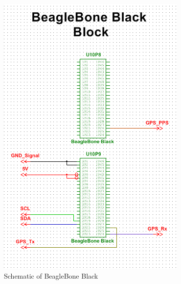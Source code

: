 

\begin{figure}[h]
\centering
\includegraphics[width=\textwidth,height=\textheight,keepaspectratio]{./KIRBY_Images/Multisim_BBB}
\caption{Schematic of BeagleBone Black}
\label{fig:Schematic_BBB}
\end{figure}

